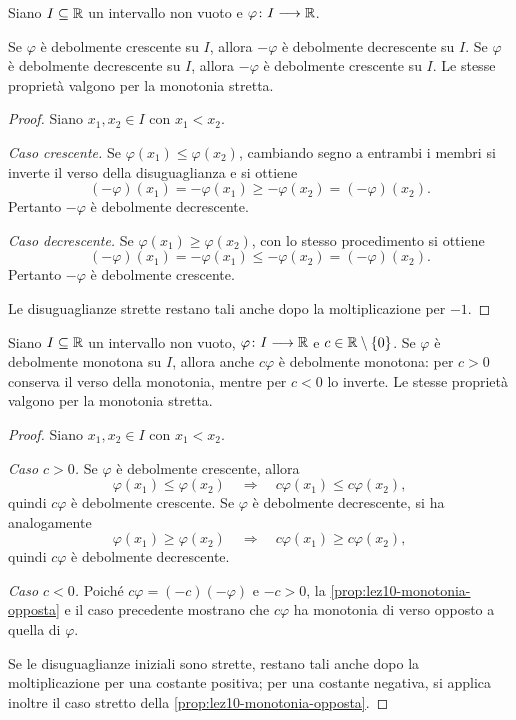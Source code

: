 \clearpage

\begin{proposition}
\label{prop:lez10-monotonia-opposta}
Siano \(I\subseteq\mathbb{R}\) un intervallo non vuoto e
\(\varphi\colon I\longrightarrow\mathbb{R}\).

Se \(\varphi\) è debolmente crescente su \(I\),
allora \(-\varphi\) è debolmente decrescente su \(I\).
Se \(\varphi\) è debolmente decrescente su \(I\),
allora \(-\varphi\) è debolmente crescente su \(I\).
Le stesse proprietà valgono per la monotonia stretta.
\end{proposition}

\begin{proof}
Siano \(x_1,x_2\in I\) con \(x_1<x_2\).

\emph{Caso crescente.}
Se \(\varphi(x_1)\le\varphi(x_2)\), cambiando
segno a entrambi i membri si inverte il verso
della disuguaglianza e si ottiene
\[
  (-\varphi)(x_1)=-\varphi(x_1)
  \ge-\varphi(x_2)=(-\varphi)(x_2).
\]
Pertanto \(-\varphi\) è debolmente decrescente.

\emph{Caso decrescente.}
Se \(\varphi(x_1)\ge\varphi(x_2)\),
con lo stesso procedimento si ottiene
\[
  (-\varphi)(x_1)=-\varphi(x_1)
  \le-\varphi(x_2)=(-\varphi)(x_2).
\]
Pertanto \(-\varphi\) è debolmente crescente.

Le disuguaglianze strette restano tali anche
dopo la moltiplicazione per \(-1\).
\end{proof}

\begin{proposition}
\label{prop:lez10-monotonia-costante}
Siano \(I\subseteq\mathbb{R}\) un intervallo non vuoto,
\(\varphi\colon I\longrightarrow\mathbb{R}\) e
\(c\in\mathbb{R}\setminus\{0\}\).
Se \(\varphi\) è debolmente monotona su \(I\),
allora anche \(c\varphi\) è debolmente monotona:
per \(c>0\) conserva il verso della monotonia,
mentre per \(c<0\) lo inverte.
Le stesse proprietà valgono per la monotonia stretta.
\end{proposition}

\begin{proof}
Siano \(x_1,x_2\in I\) con \(x_1<x_2\).

\emph{Caso \(c>0\).}
Se \(\varphi\) è debolmente crescente, allora
\[
  \varphi(x_1)\le\varphi(x_2)
  \quad\Longrightarrow\quad
  c\varphi(x_1)\le c\varphi(x_2),
\]
quindi \(c\varphi\) è debolmente crescente.
Se \(\varphi\) è debolmente decrescente, si ha analogamente
\[
  \varphi(x_1)\ge\varphi(x_2)
  \quad\Longrightarrow\quad
  c\varphi(x_1)\ge c\varphi(x_2),
\]
quindi \(c\varphi\) è debolmente decrescente.

\emph{Caso \(c<0\).}
Poiché \(c\varphi=(-c)(-\varphi)\) e \(-c>0\),
la \cref{prop:lez10-monotonia-opposta} e il caso
precedente mostrano che \(c\varphi\) ha monotonia
di verso opposto a quella di \(\varphi\).

Se le disuguaglianze iniziali sono strette,
restano tali anche dopo la moltiplicazione per
una costante positiva; per una costante negativa,
si applica inoltre il caso stretto della
\cref{prop:lez10-monotonia-opposta}.
\end{proof}

